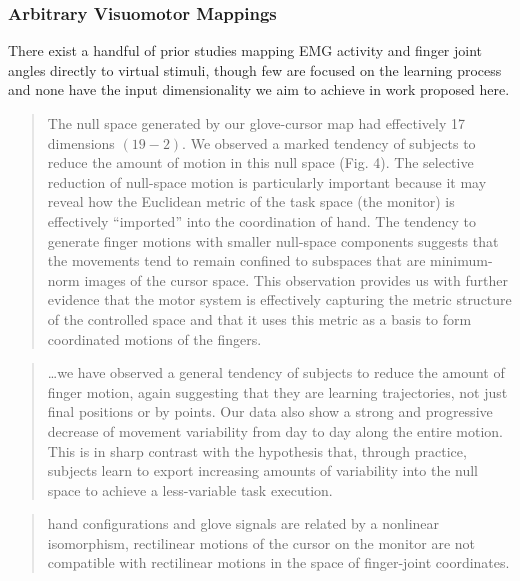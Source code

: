 \documentclass[../main.tex]{subfiles}
\begin{document}
\cite{@manleyWhenMoneyNot2014 @vanbeersMotorLearningOptimally2009
@vanbeersRandomWalkMotor2013}

\subsubsection{Arbitrary Visuomotor Mappings}\label{arbitrary-visuomotor-mappings}

There exist a handful of prior studies mapping EMG activity and finger joint angles directly to virtual stimuli, though few are focused on the learning process and none have the input dimensionality we aim to achieve in work proposed here.

\cite{@Mussa-IvaldiSensoryMotorRemapping2011}

\begin{quote} The null space generated by our glove-cursor map had effectively 17 dimensions $(19 - 2)$. We observed a marked tendency of subjects to reduce the amount of motion in this null space (Fig. 4). The selective reduction of null-space motion is particularly important because it may reveal how the Euclidean metric of the task space (the monitor) is effectively ``imported'' into the coordination of hand. The tendency to generate finger motions with smaller null-space components suggests that the movements tend to remain confined to subspaces that are minimum-norm images of the cursor space. This observation provides us with further evidence that the motor system is effectively capturing the metric structure of the controlled space and that it uses this metric as a basis to form coordinated motions of the fingers. \cite{@MosierRemappingHandMovements2005}
\end{quote}

\begin{quote}
\ldots we have observed a general tendency of subjects to reduce the amount of finger motion, again suggesting that they are learning trajectories, not just final positions or by points. Our data also show a strong and progressive decrease of movement variability from day to day along the entire motion. This is in sharp contrast with the hypothesis that, through practice, subjects learn to export increasing amounts of variability into the null space to achieve a less-variable task execution.
\end{quote}

\begin{quote}
hand configurations and glove signals are related by a nonlinear isomorphism, rectilinear motions of the cursor on the monitor are not compatible with rectilinear motions in the space of finger-joint coordinates.
\end{quote}
\end{document}
